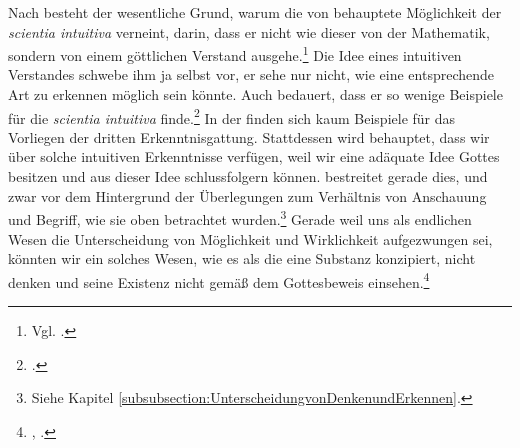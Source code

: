 Nach  besteht der wesentliche
Grund, warum  die von
 behauptete
Möglichkeit der \emph{scientia intuitiva} verneint, darin, dass er nicht wie
dieser von der Mathematik, sondern von einem göttlichen Verstand
ausgehe.\footnote{Vgl. \cite[][255]{Foerster:Die25JahrederPhilosophie2011}.}
Die Idee eines intuitiven Verstandes schwebe ihm ja selbst vor, er sehe nur
nicht, wie eine entsprechende Art zu erkennen möglich sein könnte. Auch  bedauert, dass er so
wenige Beispiele für die \emph{scientia intuitiva}
finde.\footnote{\cite[Vgl.][II: 11.18--19]{Spinoza:SpinozaOpera1972}.} In der
 finden sich kaum Beispiele für das Vorliegen der
dritten Erkenntnisgattung. Stattdessen wird behauptet, dass wir über
solche intuitiven Erkenntnisse verfügen, weil wir eine adäquate Idee
Gottes besitzen und aus dieser Idee schlussfolgern können.
 bestreitet gerade dies, und zwar vor dem Hintergrund der
Überlegungen zum Verhältnis von Anschauung und Begriff, wie sie oben betrachtet
wurden.\footnote{Siehe Kapitel
\ref{subsubsection:UnterscheidungvonDenkenundErkennen}.} Gerade weil uns als
endlichen Wesen die Unterscheidung von Möglichkeit und Wirklichkeit aufgezwungen
sei, könnten wir ein solches Wesen, wie es
 als die eine
Substanz konzipiert, nicht denken und seine Existenz nicht gemäß dem
 Gottesbeweis
einsehen.\footnote{\cite[Vgl.][\S~76]{Kant:KritikderUrteilskraft2009},
\cite[][V: 402.18--32]{Kant:GesammelteWerke1900ff.}.}

